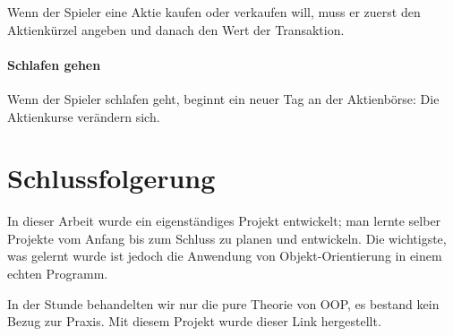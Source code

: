 \documentclass[paper=a4, fontsize=11pt]{article}
\numberwithin{equation}{section}		%
\numberwithin{figure}{section}			%
\numberwithin{table}{section}				%
\begin{document}
	Wenn der Spieler eine Aktie kaufen oder verkaufen will, muss er zuerst den Aktienkürzel angeben und danach den Wert der Transaktion.
	
	\paragraph{Schlafen gehen}
	
	Wenn der Spieler schlafen geht, beginnt ein neuer Tag an der Aktienbörse: Die Aktienkurse verändern sich. 
	
	\section{Schlussfolgerung}
	
	
	In dieser Arbeit wurde ein eigenständiges Projekt entwickelt; man lernte selber Projekte vom Anfang bis zum Schluss zu planen und entwickeln. Die wichtigste, was gelernt wurde ist jedoch die Anwendung von Objekt-Orientierung in einem echten Programm.
	
	In der Stunde behandelten wir nur die pure Theorie von OOP, es bestand kein Bezug zur Praxis. Mit diesem Projekt wurde dieser Link hergestellt.
	
\end{document}
